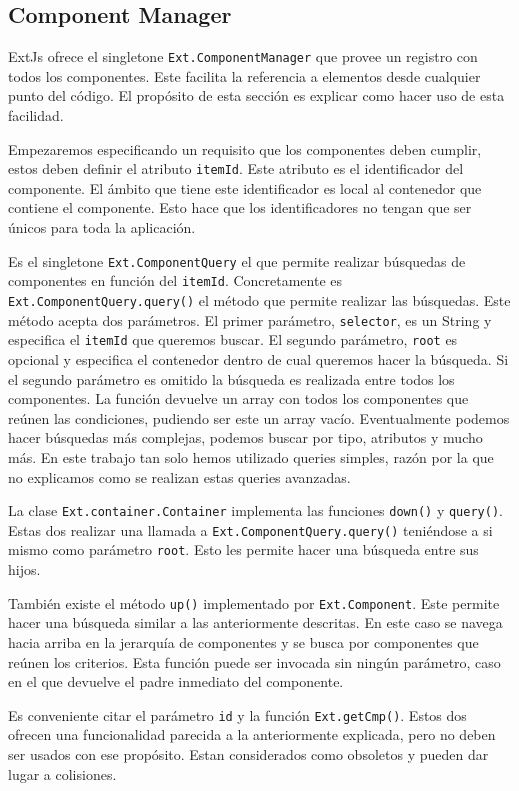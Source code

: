 	\subsection{Component Manager}
		ExtJs ofrece el singletone \texttt{Ext.ComponentManager} que provee un registro con todos los componentes. Este facilita la referencia
		a elementos desde cualquier punto del código. El propósito de esta sección es explicar como hacer uso de esta facilidad.
		\par
		Empezaremos especificando un requisito que  los componentes deben cumplir, estos deben definir el atributo \texttt{itemId}. Este
		atributo es el identificador del componente. El ámbito que tiene este identificador es local al contenedor que contiene el componente.
		Esto hace que los identificadores no tengan que ser únicos para toda la aplicación. 
		\par
		Es el singletone \texttt{Ext.ComponentQuery} el que permite realizar búsquedas de componentes en función del \texttt{itemId}.
		Concretamente es \texttt{Ext.ComponentQuery.query()} el método que permite realizar las búsquedas. Este método acepta dos parámetros.
		El primer parámetro, \texttt{selector}, es un String y especifica el \texttt{itemId} que queremos buscar. El segundo parámetro,
		\texttt{root} es opcional y especifica el contenedor dentro de cual queremos hacer la búsqueda. Si el segundo parámetro es omitido la
		búsqueda es realizada entre todos los componentes. La función devuelve un array con todos los componentes que reúnen las condiciones,
		pudiendo ser este un array vacío. Eventualmente podemos hacer búsquedas más complejas, podemos buscar por tipo, atributos y mucho más.
		En este trabajo tan solo hemos utilizado queries simples, razón por la que no explicamos como se realizan estas queries avanzadas.
		\par
		La clase \texttt{Ext.container.Container} implementa las funciones \texttt{down()} y \texttt{query()}. Estas dos realizar una llamada
		a \texttt{Ext.ComponentQuery.query()} teniéndose a si mismo como parámetro \texttt{root}. Esto les permite hacer una búsqueda entre
		sus hijos.
		\par
		También existe el método \texttt{up()} implementado por \texttt{Ext.Component}. Este permite hacer una búsqueda similar a las
		anteriormente descritas. En este caso se navega hacia arriba en la jerarquía de componentes y se busca por componentes que reúnen los
		criterios. Esta función puede ser invocada sin ningún parámetro, caso en el que devuelve el padre inmediato del componente.
		\par
		Es conveniente citar el parámetro \texttt{id} y la función \texttt{Ext.getCmp()}. Estos dos ofrecen una funcionalidad parecida a la
		anteriormente explicada, pero no deben ser usados con ese propósito. Estan considerados como obsoletos y pueden dar lugar a
		colisiones. 
